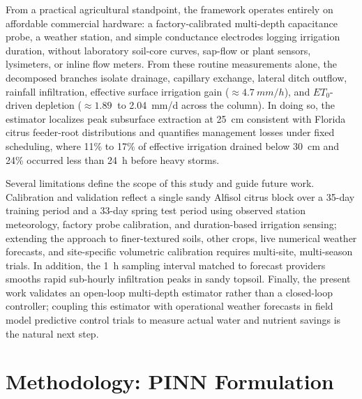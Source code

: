 \documentclass[pdflatex,sn-nature]{sn-jnl}%
\theoremstyle{thmstyleone}%
\theoremstyle{thmstyletwo}%
\theoremstyle{thmstylethree}%
\begin{document}
{From a practical agricultural standpoint, the framework operates entirely on affordable commercial hardware: a factory-calibrated multi-depth capacitance probe, a weather station, and simple conductance electrodes logging irrigation duration, without laboratory soil-core curves, sap-flow or plant sensors, lysimeters, or inline flow meters. From these routine measurements alone, the decomposed branches isolate drainage, capillary exchange, lateral ditch outflow, rainfall infiltration, effective surface irrigation gain ($\approx\SI{4.7}{mm/h}$), and $ET_0$-driven depletion ($\approx\SI{1.89}{}$ to \SI{2.04}{mm/d} across the column). In doing so, the estimator localizes peak subsurface extraction at 25~\si{cm} consistent with Florida citrus feeder-root distributions and quantifies management losses under fixed scheduling, where 11\% to 17\% of effective irrigation drained below 30~\si{cm} and 24\% occurred less than 24~\si{h} before heavy storms.

Several limitations define the scope of this study and guide future work. Calibration and validation reflect a single sandy Alfisol citrus block over a 35-day training period and a 33-day spring test period using observed station meteorology, factory probe calibration, and duration-based irrigation sensing; extending the approach to finer-textured soils, other crops, live numerical weather forecasts, and site-specific volumetric calibration requires multi-site, multi-season trials. In addition, the \SI{1}{h} sampling interval matched to forecast providers smooths rapid sub-hourly infiltration peaks in sandy topsoil. Finally, the present work validates an open-loop multi-depth estimator rather than a closed-loop controller; coupling this estimator with operational weather forecasts in field model predictive control trials to measure actual water and nutrient savings is the natural next step.}

\section{Methodology: PINN Formulation} \label{Methodology}
\end{document}
